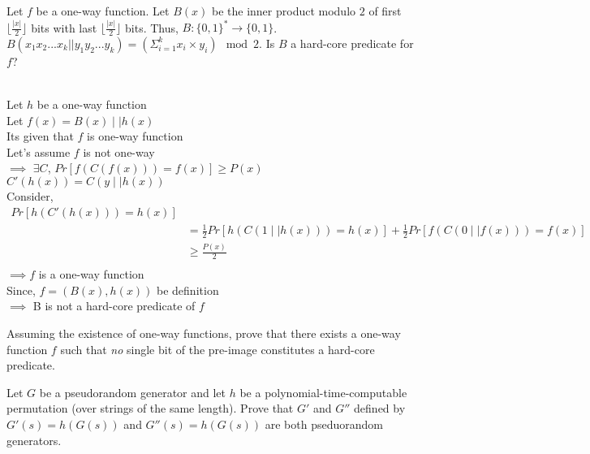 \documentclass[11pt]{exam}
\begin{document}
\begin{questions}
\question[10]  
Let $f$ be a one-way function. Let $B(x)$ be the inner product modulo $2$ of first $\lfloor \frac{|x|}{2} \rfloor$ bits with last $\lfloor \frac{|x|}{2} \rfloor$ bits. Thus, $B:\{0,1\}^* \to \{0,1\}$. $B(x_1x_2...x_k||y_1y_2...y_k)=(\Sigma_{i=1}^k x_i \times y_i) \mod 2$. Is $B$ a hard-core predicate for $f$?
\begin{solution}\\
    Let $h$ be a one-way function\\
    Let $f(x) = B(x) \mid\mid h(x)$\\
    Its given that $f$ is one-way function\\
    Let's assume $f$ is not one-way\\
    $\implies$ $\exists C$, $Pr[f(C(f(x))) = f(x)] \geq P(x)$\\
    $C'(h(x)) = C(y\mid\mid h(x))$\\
    Consider,
    \begin{align*}
        Pr[h(C'(h(x))) = h(x)] \\
        &= \frac{1}{2}Pr[h(C(1\mid\mid h(x))) = h(x)] + \frac{1}{2}Pr[f(C(0\mid\mid f(x))) = f(x)]\\
        &\geq \frac{P(x)}{2}\\
    \end{align*}
    $\implies f$ is a one-way function\\
    Since, $f=(B(x),h(x))$ be definition \\
    $\implies$ B is not a hard-core predicate of $f$
\end{solution}

\question[10] 
Assuming the existence of one-way functions, prove that there exists a one-way function $f$ such that \textit{no} single bit of the pre-image constitutes a hard-core predicate. 

\question[10] 
Let $G$ be a pseudorandom generator and let $h$ be a polynomial-time-computable permutation (over strings of the same length). Prove that $G'$ and $G''$ defined by $G'(s)=h(G(s))$ and $G''(s)=h(G(s))$ are both pseduorandom generators. 


\end{questions}
\end{document}
